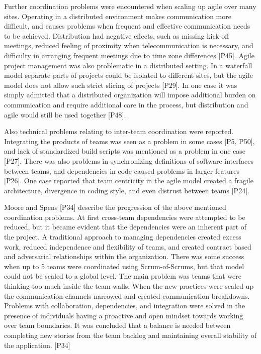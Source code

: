 \documentclass[preprint,authoryear,12pt]{elsarticle}
\begin{document}
Further coordination problems were encountered when scaling up agile over many
sites. Operating in a distributed environment makes communication more
difficult, and causes problems when frequent and effective communication needs
to be achieved. Distribution had negative effects, such as missing kick-off
meetings, reduced feeling of proximity when telecommunication is necessary, and
difficulty in arranging frequent meetings due to time zone differences [P45].
Agile project management was also problematic in a distributed setting. In a
waterfall model separate parts of projects could be isolated to different sites,
but the agile model does not allow such strict slicing of projects [P29]. In one
case it was simply admitted that a distributed organization will impose
additional burden on communication and require additional care in the process,
but distribution and agile would still be used together [P48].

Also technical problems relating to inter-team coordination were reported.
Integrating the products of teams was seen as a problem in some cases [P5, P50],
and lack of standardized build scripts was mentioned as a problem in one case
[P27]. There was also problems in synchronizing definitions of software
interfaces between teams, and dependencies in code caused problems in larger
features [P26]. One case reported that team centricity in the agile model
created a fragile architecture, divergence in coding style, and even distrust
between teams [P24].

Moore and Spens [P34] describe the progression of the above mentioned
coordination problems. At first cross-team dependencies were attempted to be
reduced, but it became evident that the dependencies were an inherent part of
the project. A traditional approach to managing dependencies created excess
work, reduced independence and flexibility of teams, and created contract based
and adversarial relationships within the organization. There was some success
when up to 5 teams were coordinated using Scrum-of-Scrums, but that model could
not be scaled to a global level. The main problem was teams that were thinking
too much inside the team walls. When the new practices were scaled up the
communication channels narrowed and created communication breakdowns. Problems
with collaboration, dependencies, and integration were solved in the presence of
individuals having a proactive and open mindset towards working over team
boundaries. It was concluded that a balance is needed between completing new
stories from the team backlog and maintaining overall stability of the
application. [P34]
\end{document}

